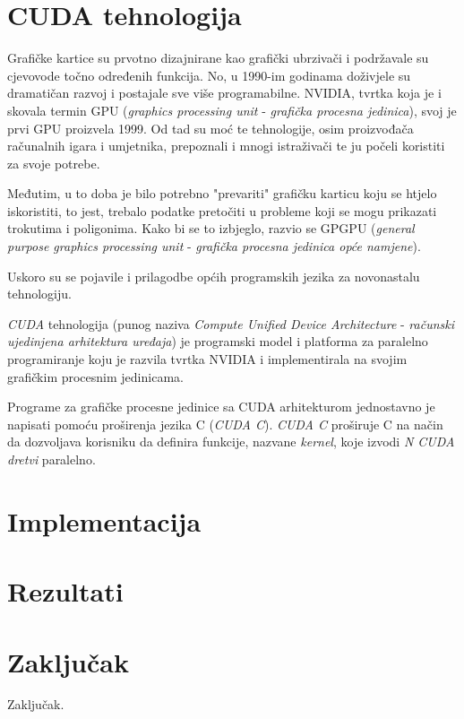 \documentclass[times, utf8, zavrsni]{fer}
\begin{document}
\chapter{CUDA tehnologija}
\indent

Grafičke kartice su prvotno dizajnirane kao grafički ubrzivači i podržavale su cjevovode točno određenih funkcija. No, u 1990-im godinama doživjele su dramatičan razvoj i postajale sve više programabilne. NVIDIA, tvrtka koja je i skovala termin GPU (\textit{graphics processing unit} - \textit{grafička procesna jedinica}), svoj je prvi GPU proizvela 1999. Od tad su moć te tehnologije, osim proizvođača računalnih igara i umjetnika, prepoznali i mnogi istraživači te ju počeli koristiti za svoje potrebe.

Međutim, u to doba je bilo potrebno "prevariti" grafičku karticu koju se htjelo iskoristiti, to jest, trebalo podatke pretočiti u probleme koji se mogu prikazati trokutima i poligonima. Kako bi se to izbjeglo, razvio se GPGPU (\textit{general purpose graphics processing unit} - \textit{grafička procesna jedinica opće namjene}).

Uskoro su se pojavile i prilagodbe općih programskih jezika za novonastalu tehnologiju.

\textit{CUDA} tehnologija (punog naziva \textit{Compute Unified Device Architecture} - \textit{računski ujedinjena arhitektura uređaja}) je programski model i platforma za paralelno programiranje koju je razvila tvrtka NVIDIA i implementirala na svojim grafičkim procesnim jedinicama.

Programe za grafičke procesne jedinice sa CUDA arhitekturom jednostavno je napisati pomoću proširenja jezika C (\textit{CUDA C}). \textit{CUDA C} proširuje C na način da dozvoljava korisniku da definira funkcije, nazvane \textit{kernel}, koje izvodi \textit{N CUDA dretvi} paralelno.



\chapter{Implementacija}

\chapter{Rezultati}

\chapter{Zaključak}
Zaključak.
\end{document}
